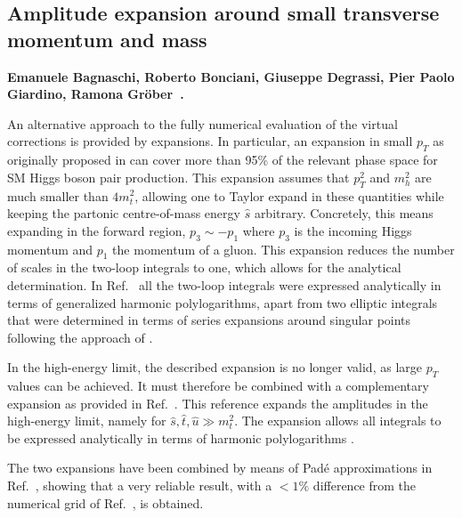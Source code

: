 \subsection{Amplitude expansion around small transverse momentum and mass}
\label{sec:expGPL}


\textbf{Emanuele Bagnaschi, Roberto Bonciani, Giuseppe Degrassi, Pier Paolo Giardino, Ramona Gröber~\cite{Bonciani:2018omm,Bagnaschi:2023rbx}.}

\noindent An alternative approach to the fully numerical evaluation of the virtual corrections is provided by expansions. In particular, an expansion in small $p_T$ as originally proposed in \cite{Bonciani:2018omm} can cover more than 95\% of the relevant phase space for SM Higgs boson pair production. This expansion assumes that $p_T^2$ and $m_h^2$ are much smaller than $4 m_t^2$, allowing one to Taylor expand in these quantities while keeping the partonic centre-of-mass energy $\hat{s}$ arbitrary. Concretely, this means expanding in the forward region, $p_3\sim - p_1$ where $p_3$ is the incoming Higgs momentum and $p_1$ the momentum of a gluon. This expansion reduces the number of scales in the two-loop integrals to one, which allows for the analytical determination. In Ref.~\cite{Bonciani:2018omm} all the two-loop integrals were expressed analytically in terms of generalized harmonic polylogarithms, apart from two elliptic integrals that were determined in terms of series expansions around singular points \cite{Bonciani:2018uvv} following the approach of \cite{Pozzorini:2005ff, Aglietti:2007as}.

In the high-energy limit, the described expansion is no longer valid, as large $p_T$ values can be achieved. It must therefore be combined with a complementary expansion as provided in Ref.~\cite{Davies:2018qvx}. This reference expands the amplitudes in the high-energy limit, namely for $\hat{s}, \hat{t}, \hat{u} \gg m_t^2$. The expansion allows all integrals to be expressed analytically in terms of harmonic polylogarithms \cite{Davies:2018ood}.

The two expansions have been combined by means of Pad\'e approximations in Ref.~\cite{Bellafronte:2022jmo}, showing that a very reliable result, with a $< 1\%$ difference from the numerical grid of Ref.~\cite{Davies:2019dfy}, is obtained.

